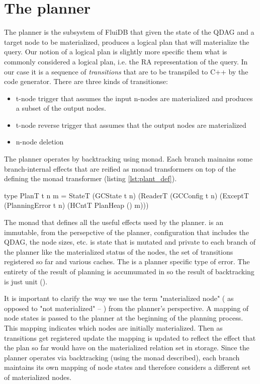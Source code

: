 \hline
\section{The planner}
\label{sec:planner}

The planner is the subsystem of FluiDB that given the state of the
QDAG and a target node to be materialized, produces a logical plan that
will materialize the query.  Our notion of a logical plan is slightly
more specific them what is commonly considered a logical plan,
i.e. the RA representation of the query. In our case it is a sequence
of \emph{transitions} that are to be transpiled to C++ by the code
generator. There are three kinds of transitionse:

\begin{itemize}
\item t-node trigger that assumes the input n-nodes are materialized and
produces a subset of the output nodes.
\item t-node reverse trigger that assumes that the output nodes are materialized
\item n-node deletion
\end{itemize}

The planner operates by backtracking using  monad. Each branch
mainains some branch-internal effects that are reified as monad
transformers on top of the  defining the  monad
transformer (listing \ref{lst:plant_def}).

\begin{code}
\begin{haskellcode}
type PlanT t n m =
  StateT
    (GCState t n)
    (ReaderT (GCConfig t n)
     (ExceptT (PlanningError t n)
      (HCntT PlanHeap () m)))
\end{haskellcode}
  \caption{\label{lst:plant_def}The monad that defines all the useful
    effects used by the planner.  is an immutable,
    from the persepctive of the planner, configuration that includes
    the QDAG, the node sizes, etc.  is state that is
    mutated and private to each branch of the planner like the
    materialized status of the nodes, the set of transitions
    registered so far and various caches. The 
    is a planner specific type of error. The entirety of the result of
    planning is accumumated in  so the result of
    backtracking is just unit (\hask{()}).}
\end{code}

It is important to clarify the way we use the term "materialized node"
( as opposed to "not materialized" -- ) from the planner's
perspective. A mapping of node states is passed to the planner at the
beginning of the planning process. This mapping indicates which nodes
are initially materialized. Then as transitions get registered update
the mapping is updated to reflect the effect that the plan so far
would have on the materialized relation set in storage. Since the
planner operates via backtracking (using the  monad described),
each branch maintains its own mapping of node states and therefore
considers a different set of materialized nodes.

